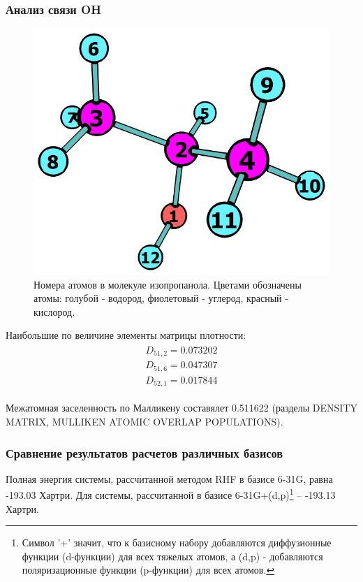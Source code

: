 \subsubsection*{Анализ связи OH}
\begin{figure}[H]
\centering
\captionsetup{justification=centering}
\includegraphics[scale=0.4]{fig/1.jpg}
\caption{Номера атомов в молекуле изопропанола. Цветами обозначены атомы: голубой - водород, фиолетовый - углерод, красный - кислород.}
\end{figure}

Наибольшие по величине элементы матрицы плотности:
\begin{equation}
\begin{split}
\begin{gathered}
D_{51,2} = 0.073202 \\
D_{51,6} = 0.047307 \\
D_{52,1} = 0.017844
\end{gathered}
\end{split}
\end{equation}

Межатомная заселенность по Малликену составялет 0.511622 (разделы DENSITY MATRIX, MULLIKEN ATOMIC OVERLAP POPULATIONS).

\subsubsection*{Сравнение результатов расчетов различных базисов}
Полная энергия системы, рассчитанной методом RHF в базисе 6-31G, равна -193.03 Хартри. Для системы, рассчитанной в базисе 6-31G+(d,p)\footnote{Символ '+' значит, что к базисному набору добавляются диффузионные функции (d-функции) для всех тяжелых атомов, а (d,p) - добавляются поляризационные функции (p-функции) для всех атомов.} -- -193.13 Хартри. 

